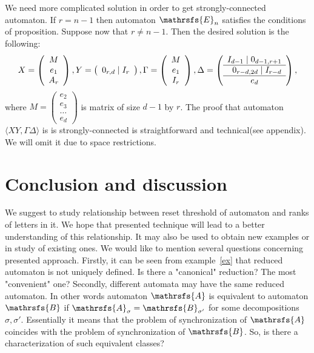 \documentclass[11pt]{llncs}
\newcommand{\A}{\mathrsfs{A}}
\newcommand{\G}{\Gamma}
\newcommand{\D}{\Delta}
\begin{document}
We need more complicated solution in order to get strongly-connected automaton.
If $r = n - 1$ then automaton $\mathrsfs{E}_n$ satisfies the conditions of proposition.
Suppose now that $r \neq n - 1$.
Then the desired solution is the following:
$$
X =
\left(
\begin{array}{c}
M \\
e_1 \\
A_r
\end{array}
\right),
Y = 
\left(
\begin{array}{c}
0_{r,d} \mid I_r
\end{array}
\right),
\G = 
\left(
\begin{array}{c}
M \\
e_1 \\
I_r
\end{array}
\right),
\D = 
\left(
\begin{array}{c}
I_{d - 1} \mid 0_{d-1,r + 1} \\ \hline
\textbf{\,\,\,} 0_{r-d,2d} \mid I_{r - d} \\ \hline
e_d
\end{array}
\right),
$$
where $M =
\left(
\begin{smallmatrix}
e_2\\
e_3\\
\ldots\\
e_d
\end{smallmatrix}\right)$ is matrix of size $d - 1$ by $r$.
The proof that automaton $\langle XY, \G\D\rangle$ is is strongly-connected is
straightforward and technical(see appendix). We will omit it due to space restrictions.

\section{Conclusion and discussion}
We suggest to study relationship between reset threshold of automaton and ranks of letters in it.
We hope that presented technique will lead to a better understanding of this relationship. 
It may also be used to obtain 
new examples or in study of existing ones.
We would like to mention several questions concerning presented approach.
Firstly, it can be seen from example~\ref{ex} that reduced automaton is not uniquely defined. 
Is there a "canonical" reduction? The most "convenient" one?
Secondly, different automata may have the same reduced automaton. In other words automaton $\A$ 
is equivalent to automaton $\mathrsfs{B}$ if $\mathrsfs{A}_{\sigma} = \mathrsfs{B}_{\sigma'}$ for
some decompositions $\sigma, \sigma'$. Essentially it means that the problem of synchronization of $\A$ 
coincides with the problem of synchronization of $\mathrsfs{B}$. So, is there a characterization of
such equivalent classes?
\end{document}
